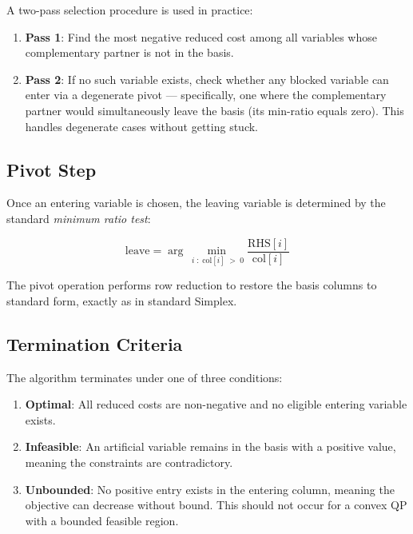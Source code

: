 \documentclass[conference]{IEEEtran}
\begin{document}
A two-pass selection procedure is used in practice:

\begin{enumerate}
    \item \textbf{Pass 1}: Find the most negative reduced cost among all
          variables whose complementary partner is not in the basis.
    \item \textbf{Pass 2}: If no such variable exists, check whether any
          blocked variable can enter via a degenerate pivot --- specifically,
          one where the complementary partner would simultaneously leave the
          basis (its min-ratio equals zero). This handles degenerate cases
          without getting stuck.
\end{enumerate}

\subsection{Pivot Step}

Once an entering variable is chosen, the leaving variable is determined by the
standard \textit{minimum ratio test}:

\begin{equation}
    \text{leave} = \arg\min_{\;i\;:\;\text{col}[i]\;>\;0}
    \frac{\text{RHS}[i]}{\text{col}[i]}
    \label{eq:min_ratio}
\end{equation}

The pivot operation performs row reduction to restore the basis columns to
standard form, exactly as in standard Simplex.

\subsection{Termination Criteria}

The algorithm terminates under one of three conditions:

\begin{enumerate}
    \item \textbf{Optimal}: All reduced costs are non-negative and no eligible
          entering variable exists.
    \item \textbf{Infeasible}: An artificial variable remains in the basis with
          a positive value, meaning the constraints are contradictory.
    \item \textbf{Unbounded}: No positive entry exists in the entering column,
          meaning the objective can decrease without bound. This should not
          occur for a convex QP with a bounded feasible region.
\end{enumerate}
\end{document}
